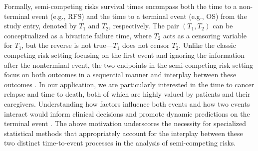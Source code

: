 \documentclass[12pt]{article}
\theoremstyle{plain}
\begin{document}
Formally, semi-competing risks survival times encompass both the time to a non-terminal event (e.g., RFS) and the time to a terminal event (e.g., OS) from the study entry, denoted by $T_1$ and $T_2$, respectively. The pair $(T_{1},T_{2})$ can be conceptualized as a bivariate failure time, where $T_{2}$ acts as a censoring variable for $T_{1}$, but the reverse is not true—$T_{1}$ does not censor $T_{2}$. %
Unlike the classic competing risk setting \citep{fine1999competing,young2020} focusing on the first event and ignoring the information after the nonterminal event, the two endpoints in the semi-competing risk setting focus on both outcomes in a sequential manner and interplay between these outcomes \citep{varadhan2014semicompeting}. In our application, we are particularly interested in the time to cancer relapse and time to death, both of which are highly valued by patients and their caregivers. 
Understanding how factors influence both events and how two events interact would inform clinical decisions and promote dynamic predictions on the terminal event \citep{li2016flexible}. The above motivation underscores the necessity for specialized statistical methods that appropriately account for the interplay between these two distinct time-to-event processes in the analysis of semi-competing risks.


\end{document}
